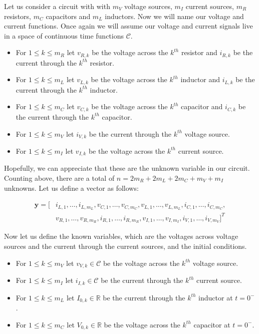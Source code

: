 \documentclass[14pt,a5paper,twoside]{book}
\begin{document}
Let us consider a circuit with with $m_V$ voltage sources, $m_I$ current sources, $m_R$ resistors, $m_C$ capacitors and $m_L$ inductors. Now we will name our voltage and current functions. Once again we will assume our voltage and current signals live in a space of continuous time functions $\mathcal{C}$.

\begin{itemize}
\item{For $1\leq k\leq m_R$ let $v_{R,k}$ be the voltage across the $k^{th}$ resistor and $i_{R,k}$ be the current through the $k^{th}$ resistor.}
\item{For $1\leq k\leq m_L$ let $v_{L,k}$ be the voltage across the $k^{th}$ inductor and $i_{L,k}$ be the current through the $k^{th}$ inductor.}
\item{For $1\leq k\leq m_C$ let $v_{C,k}$ be the voltage across the $k^{th}$ capacitor and $i_{C,k}$ be the current through the $k^{th}$ capacitor.}
\item{For $1\leq k\leq m_V$ let $i_{V,k}$ be the current through the $k^{th}$ voltage source.}
\item{For $1\leq k\leq m_I$ let $v_{I,k}$ be the voltage across the $k^{th}$ current source.}
\end{itemize}


Hopefully, we can appreciate that these are the unknown variable in our circuit. Counting above, there are a total of $n = 2m_R + 2m_L + 2m_C + m_V + m_I$ unknowns. Let us define a vector as follows:

\begin{align*}
\mathbf{y} = [ &i_{L,1}, \ldots ,i_{L,m_L}, v_{C,1}, \ldots ,v_{C,m_C}, v_{L,1}, \ldots ,v_{L,m_L}, i_{C,1}, \ldots ,i_{C,m_C}, \\
				&v_{R,1}, \ldots ,v_{R,m_R}, i_{R,1}, \ldots ,i_{R,m_R}, v_{I,1}, \ldots, v_{I,m_I}, i_{V,1}, \ldots, i_{V,m_V}]^T
\end{align*}

Now let us define the known variables, which are the voltages across voltage sources and the current through the current sources, and the initial conditions.
\begin{itemize}
\item{For $1\leq k\leq m_V$ let $v_{V,k}\in\mathcal{C}$ be the voltage across the $k^{th}$ voltage source.}
\item{For $1\leq k\leq m_I$ let $i_{I,k}\in\mathcal{C}$ be the current through the $k^{th}$ current source.}
\item{For $1\leq k\leq m_L$ let $I_{0,k}\in\mathbb{R}$ be the current through the $k^{th}$ inductor at $t=0^-$.}
\item{For $1\leq k\leq m_C$ let $V_{0,k}\in\mathbb{R}$ be the voltage across the $k^{th}$ capacitor at $t=0^-$.}
\end{itemize}
\end{document}
